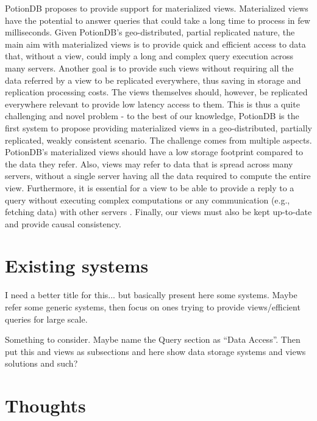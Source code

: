 PotionDB proposes to provide support for materialized views.
Materialized views have the potential to answer queries that could take a long time to process in few milliseconds.
Given PotionDB's geo-distributed, partial replicated nature, the main aim with materialized views is to provide quick and efficient access to data that, without a view, could imply a long and complex query execution across many servers.
Another goal is to provide such views without requiring all the data referred by a view to be replicated everywhere, thus saving in storage and replication processing costs.
The views themselves should, however, be replicated everywhere relevant to provide low latency access to them.
This is thus a quite challenging and novel problem - to the best of our knowledge, PotionDB is the first system to propose providing materialized views in a geo-distributed, partially replicated, weakly consistent scenario.
The challenge comes from multiple aspects.
PotionDB's materialized views should have a low storage footprint compared to the data they refer.
Also, views may refer to data that is spread across many servers, without a single server having all the data required to compute the entire view.
Furthermore, it is essential for a view to be able to provide a reply to a query without executing complex computations or any communication (e.g., fetching data) with other servers .
Finally, our views must also be kept up-to-date and provide causal consistency.

\section{Existing systems}

I need a better title for this... but basically present here some systems. Maybe refer some generic systems, then focus on ones trying to provide views/efficient queries for large scale.

Something to consider. Maybe name the Query section as ``Data Access''. Then put this and views as subsections and here show data storage systems and views solutions and such?

\section{Thoughts}

